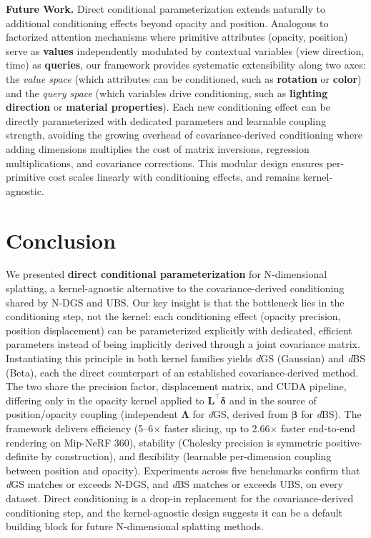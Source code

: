 \documentclass{article}
\newcommand{\dgs}{\textit{d}GS\xspace}
\newcommand{\dbs}{\textit{d}BS\xspace}
\theoremstyle{plain}
\theoremstyle{definition}
\theoremstyle{remark}
\begin{document}
\textbf{Future Work.} Direct conditional parameterization extends naturally to additional conditioning effects beyond opacity and position. Analogous to factorized attention mechanisms where primitive attributes (opacity, position) serve as \textbf{values} independently modulated by contextual variables (view direction, time) as \textbf{queries}, our framework provides systematic extensibility along two axes: the \textit{value space} (which attributes can be conditioned, such as \textbf{rotation} or \textbf{color}) and the \textit{query space} (which variables drive conditioning, such as \textbf{lighting direction} or \textbf{material properties}). Each new conditioning effect can be directly parameterized with dedicated parameters and learnable coupling strength, avoiding the growing overhead of covariance-derived conditioning where adding dimensions multiplies the cost of matrix inversions, regression multiplications, and covariance corrections. This modular design ensures per-primitive cost scales linearly with conditioning effects, and remains kernel-agnostic.

\section{Conclusion}

We presented \textbf{direct conditional parameterization} for N-dimensional splatting, a kernel-agnostic alternative to the covariance-derived conditioning shared by N-DGS and UBS. Our key insight is that the bottleneck lies in the conditioning step, not the kernel: each conditioning effect (opacity precision, position displacement) can be parameterized explicitly with dedicated, efficient parameters instead of being implicitly derived through a joint covariance matrix. Instantiating this principle in both kernel families yields \dgs{} (Gaussian) and \dbs{} (Beta), each the direct counterpart of an established covariance-derived method. The two share the precision factor, displacement matrix, and CUDA pipeline, differing only in the opacity kernel applied to $\mathbf{L}^\top\boldsymbol{\delta}$ and in the source of position/opacity coupling (independent $\boldsymbol{\Lambda}$ for \dgs{}, derived from $\boldsymbol{\beta}$ for \dbs{}). The framework delivers efficiency (5--6$\times$ faster slicing, up to 2.66$\times$ faster end-to-end rendering on Mip-NeRF 360), stability (Cholesky precision is symmetric positive-definite by construction), and flexibility (learnable per-dimension coupling between position and opacity). Experiments across five benchmarks confirm that \dgs{} matches or exceeds N-DGS, and \dbs{} matches or exceeds UBS, on every dataset. Direct conditioning is a drop-in replacement for the covariance-derived conditioning step, and the kernel-agnostic design suggests it can be a default building block for future N-dimensional splatting methods.
\end{document}

